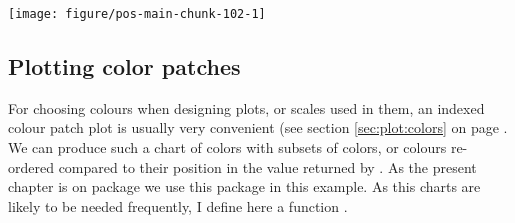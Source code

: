 \documentclass[krantz2]{krantz}\usepackage{knitr}%
\begin{document}
\begin{knitrout}\footnotesize
{}\color{fgcolor}\begin{kframe}
\begin{alltt}
  \hlopt{+}
  \hlstd{(} \hlstd{=} \hlstd{,}  \hlstd{=} \hlstd{,}  \hlstd{=} \hlstd{)} \hlopt{+}
  \hlstd{(} \hlstd{=} \hlstd{)} \hlopt{+}
  \hlstd{(}\hlopt{~}  \hlstd{=} \hlstd{)} \hlopt{+}
  \hlstd{(}\hlstd{)}
\end{alltt}
\end{kframe}

{\centering \texttt{[image: figure/pos-main-chunk-102-1]} 

}



\end{knitrout}

\subsection{Plotting color patches}

For choosing colours when designing plots, or scales used in them, an indexed colour patch plot is usually very convenient (see section \ref{sec:plot:colors} on page \pageref{sec:plot:colors}. We can produce such a chart of colors with subsets of colors, or colours re-ordered compared to their position in the value returned by . As the present chapter is on package \ggplot we use this package in this example. As this charts are likely to be needed frequently, I define here a function .
\end{document}
